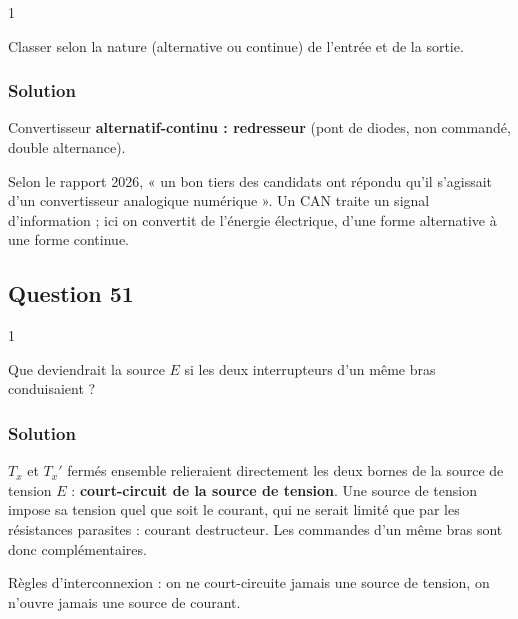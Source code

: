 \documentclass[11pt,a4paper]{article}
\begin{document}
\begin{indication}{1}

Classer selon la nature (alternative ou continue) de l'entrée et de la sortie.

\end{indication}

\hypertarget{solution-49}{%
\subsubsection{Solution}\label{solution-49}}

Convertisseur \textbf{alternatif-continu : redresseur} (pont de diodes, non commandé, double alternance).

\begin{piege}

Selon le rapport 2026, « un bon tiers des candidats ont répondu qu'il s'agissait d'un convertisseur analogique numérique ». Un CAN traite un signal d'information ; ici on convertit de l'énergie électrique, d'une forme alternative à une forme continue.

\end{piege}

\hypertarget{question-51}{%
\subsection{Question 51}\label{question-51}}

\begin{indication}{1}

Que deviendrait la source \(E\) si les deux interrupteurs d'un même bras conduisaient ?

\end{indication}

\hypertarget{solution-50}{%
\subsubsection{Solution}\label{solution-50}}

\(T_x\) et \(T_x'\) fermés ensemble relieraient directement les deux bornes de la source de tension \(E\) : \textbf{court-circuit de la source de tension}. Une source de tension impose sa tension quel que soit le courant, qui ne serait limité que par les résistances parasites : courant destructeur. Les commandes d'un même bras sont donc complémentaires.

\begin{methode}

Règles d'interconnexion : on ne court-circuite jamais une source de tension, on n'ouvre jamais une source de courant.

\end{methode}
\end{document}
